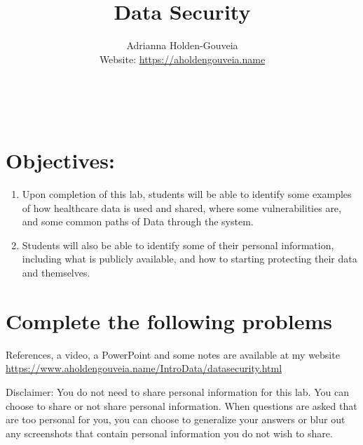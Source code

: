 \documentclass[12pt]{article}
\title{Data Security}
\author{
        Adrianna Holden-Gouveia \\
        Website: \url{https://aholdengouveia.name}\\ 
        \date{\vspace{-5ex}}
        \faLinkedin{: aholdengouveia} \\
        \faGithub {: aholdengouveia} \\
        }
\begin{document}
    

\maketitle


\section*{Objectives:}
\begin{enumerate}
    \item Upon completion of this lab, students will be able to identify some examples of how healthcare data is used and shared, where some vulnerabilities are, and some common paths of Data through the system.  
    \item Students will also be able to identify some of their personal information, including what is publicly available, and how to starting protecting their data and themselves.
\end{enumerate}
\section*{Complete the following problems}

References, a video, a PowerPoint and some notes are available at my website
\url {https://www.aholdengouveia.name/IntroData/datasecurity.html}

Disclaimer: You do not need to share personal information for this lab.  You can choose to share or not share personal information.  When questions are asked that are too personal for you, you can choose to generalize your answers or blur out any screenshots that contain personal information you do not wish to share. 
\end{document}

